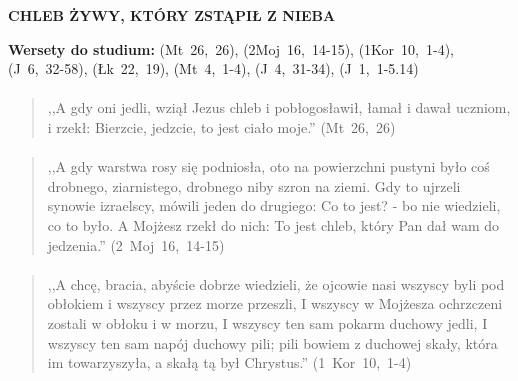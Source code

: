 \documentclass[10pt,a4paper,oneside]{article}
\begin{document}
\centerline{\textbf{\MakeUppercase{Chleb żywy, który zstąpił z nieba}}}
\begin{center}
\textbf{Wersety do studium:} 
\mbox{(Mt 26, 26)}, \mbox{(2Moj 16, 14-15)}, \mbox{(1Kor 10, 1-4)}, \mbox{(J 6, 32-58)}, \mbox{(Łk 22, 19)}, \mbox{(Mt 4, 1-4)}, \mbox{(J 4, 31-34)}, \mbox{(J 1, 1-5.14)}
\end{center}
\paragraph{}
\begin{quote}
,,A gdy oni jedli, wziął Jezus chleb i pobłogosławił, łamał i dawał uczniom, i rzekł: Bierzcie, jedzcie, to jest ciało moje.'' \mbox{(Mt 26, 26)}
\end{quote}
\paragraph{}
\begin{quote}
,,A gdy warstwa rosy się podniosła, oto na powierzchni pustyni było coś drobnego, ziarnistego, drobnego niby szron na ziemi. Gdy to ujrzeli synowie izraelscy, mówili jeden do drugiego: Co to jest? - bo nie wiedzieli, co to było. A Mojżesz rzekł do nich: To jest chleb, który Pan dał wam do jedzenia.'' \mbox{(2 Moj 16, 14-15)}
\end{quote}
\paragraph{}
\begin{quote}
,,A chcę, bracia, abyście dobrze wiedzieli, że ojcowie nasi wszyscy byli pod obłokiem i wszyscy przez morze przeszli, I wszyscy w Mojżesza ochrzczeni zostali w obłoku i w morzu, I wszyscy ten sam pokarm duchowy jedli, I wszyscy ten sam napój duchowy pili; pili bowiem z duchowej skały, która im towarzyszyła, a skałą tą był Chrystus.'' \mbox{(1 Kor 10, 1-4)}
\end{quote}
\end{document}
